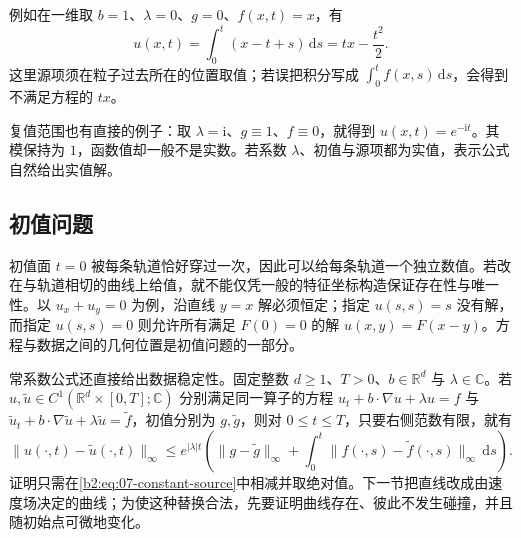例如在一维取 \(b=1\)、\(\lambda=0\)、\(g=0\)、\(f(x,t)=x\)，有
\[
 u(x,t)=\int_0^t(x-t+s)\,\mathrm ds=tx-\frac{t^2}{2}.
\]
这里源项须在粒子过去所在的位置取值；若误把积分写成 \(\int_0^tf(x,s)\,\mathrm ds\)，会得到不满足方程的 \(tx\)。

复值范围也有直接的例子：取 \(\lambda=\mathrm i\)、\(g\equiv1\)、\(f\equiv0\)，就得到 \(u(x,t)=e^{-\mathrm it}\)。其模保持为 \(1\)，函数值却一般不是实数。若系数 \(\lambda\)、初值与源项都为实值，表示公式自然给出实值解。

\subsection{初值问题}
\label{b2:subsec:070104}

初值面 \(t=0\) 被每条轨道恰好穿过一次，因此可以给每条轨道一个独立数值。若改在与轨道相切的曲线上给值，就不能仅凭一般的特征坐标构造保证存在性与唯一性。以 \(u_x+u_y=0\) 为例，沿直线 \(y=x\) 解必须恒定；指定 \(u(s,s)=s\) 没有解，而指定 \(u(s,s)=0\) 则允许所有满足 \(F(0)=0\) 的解 \(u(x,y)=F(x-y)\)。方程与数据之间的几何位置是初值问题的一部分。

\ProseParagraphBreak

常系数公式还直接给出数据稳定性。固定整数 \(d\geq1\)、\(T>0\)、\(b\in\mathbb R^d\) 与 \(\lambda\in\mathbb C\)。若 \(u,\widetilde u\in C^1(\mathbb R^d\times[0,T];\mathbb C)\) 分别满足同一算子的方程 \(u_t+b\cdot\nabla u+\lambda u=f\) 与 \(\widetilde u_t+b\cdot\nabla\widetilde u+\lambda\widetilde u=\widetilde f\)，初值分别为 \(g,\widetilde g\)，则对 \(0\leq t\leq T\)，只要右侧范数有限，就有
\[
 \|u(\cdot,t)-\widetilde u(\cdot,t)\|_\infty
 \leq e^{|\lambda|t}\left(\|g-\widetilde g\|_\infty
 +\int_0^t\|f(\cdot,s)-\widetilde f(\cdot,s)\|_\infty\,\mathrm ds\right).
\]
证明只需在\eqref{b2:eq:07-constant-source}中相减并取绝对值。下一节把直线改成由速度场决定的曲线；为使这种替换合法，先要证明曲线存在、彼此不发生碰撞，并且随初始点可微地变化。
